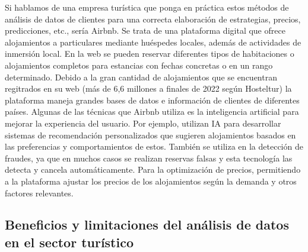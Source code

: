 \documentclass[
  letterpaper,
  DIV=11,
  numbers=noendperiod]{scrreprt}
\begin{document}
Si hablamos de una empresa turística que ponga en práctica estos métodos
de análisis de datos de clientes para una correcta elaboración de
estrategias, precios, predicciones, etc., sería Airbnb. Se trata de una
plataforma digital que ofrece alojamientos a particulares mediante
huéspedes locales, además de actividades de inmersión local. En la web
se pueden reservar diferentes tipos de habitaciones o alojamientos
completos para estancias con fechas concretas o en un rango determinado.
Debido a la gran cantidad de alojamientos que se encuentran regitrados
en su web (más de 6,6 millones a finales de 2022 según Hosteltur) la
plataforma maneja grandes bases de datos e información de clientes de
diferentes países. Algunas de las técnicas que Airbnb utiliza es la
inteligencia artificial para mejorar la experiencia del usuario. Por
ejemplo, utilizan IA para desarrollar sistemas de recomendación
personalizados que sugieren alojamientos basados en las preferencias y
comportamientos de estos. También se utiliza en la detección de fraudes,
ya que en muchos casos se realizan reservas falsas y esta tecnología las
detecta y cancela automáticamente. Para la optimización de precios,
permitiendo a la plataforma ajustar los precios de los alojamientos
según la demanda y otros factores relevantes.

\hypertarget{beneficios-y-limitaciones-del-anuxe1lisis-de-datos-en-el-sector-turuxedstico}{%
\subsection{Beneficios y limitaciones del análisis de datos en el sector
turístico}\label{beneficios-y-limitaciones-del-anuxe1lisis-de-datos-en-el-sector-turuxedstico}}
\end{document}
